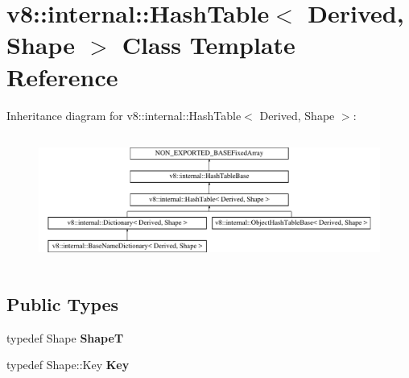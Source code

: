 \hypertarget{classv8_1_1internal_1_1HashTable}{}\section{v8\+:\+:internal\+:\+:Hash\+Table$<$ Derived, Shape $>$ Class Template Reference}
\label{classv8_1_1internal_1_1HashTable}
Inheritance diagram for v8\+:\+:internal\+:\+:Hash\+Table$<$ Derived, Shape $>$\+:\begin{figure}[H]
\begin{center}
\leavevmode
\includegraphics[height=4.281345cm]{classv8_1_1internal_1_1HashTable}
\end{center}
\end{figure}
\subsection*{Public Types}
\begin{DoxyCompactItemize}
\item 
\mbox{\label{classv8_1_1internal_1_1HashTable_a29342279fa3777537fc1a2f05a3d83cf}} 
typedef Shape {\bfseries ShapeT}
\item 
\mbox{\label{classv8_1_1internal_1_1HashTable_a1955f62c911bdf2f012678137956c803}} 
typedef Shape\+::\+Key {\bfseries Key}
\end{DoxyCompactItemize}
